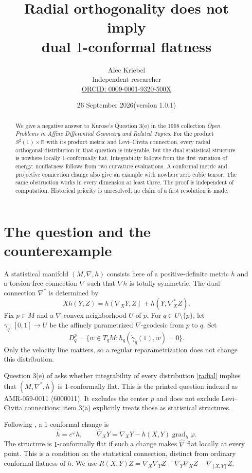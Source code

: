 \documentclass[11pt]{article}
\title{Radial orthogonality does not imply\\dual $1$-conformal flatness}
\author{Alec Kriebel\\\small Independent researcher\\
\small\href{https://orcid.org/0009-0001-9320-500X}{ORCID: 0009-0001-9320-500X}}
\date{26 September 2026\quad (version 1.0.1)}
\newcommand{\R}{\mathbb R}
\newcommand{\grad}{\operatorname{grad}}
\begin{document}
\maketitle
\begin{abstract}
We give a negative answer to Kurose's Question 3(e) in the 1998 collection
\emph{Open Problems in Affine Differential Geometry and Related Topics}.
For the product $S^2(1)\times\R$ with its product metric and Levi--Civita
connection, every radial orthogonal distribution in that question is
integrable, but the dual statistical structure is nowhere locally
$1$-conformally flat. Integrability follows from the first variation of
energy; nonflatness follows from two curvature evaluations. A conformal
metric and projective connection change also give an example with nowhere
zero cubic tensor. The same obstruction works in every dimension at least
three. The proof is independent of computation. Historical priority is
unresolved; no claim of a first resolution is made.
\end{abstract}

\section{The question and the counterexample}
A statistical manifold $(M,\nabla,h)$ consists here of a positive-definite
metric $h$ and a torsion-free connection $\nabla$ such that $\nabla h$ is
totally symmetric. The dual connection $\nabla^*$ is determined by
\[
Xh(Y,Z)=h(\nabla_XY,Z)+h(Y,\nabla_X^*Z).
\]
Fix $p\in M$ and a $\nabla$-convex neighborhood $U$ of $p$. For
$q\in U\setminus\{p\}$, let $\gamma_q:[0,1]\to U$ be the affinely
parametrized $\nabla$-geodesic from $p$ to $q$. Set
\begin{equation}\label{radial}
D^p_q=\{w\in T_qM:h_q(\dot\gamma_q(1),w)=0\}.
\end{equation}
Only the velocity line matters, so a regular reparametrization does not
change this distribution.

Question 3(e) of \cite[p.~126]{FMU} asks whether integrability of every
distribution \eqref{radial} implies that $(M,\nabla^*,h)$ is
$1$-conformally flat. This is the printed question indexed as
AMR-059-0011 (6000011). It excludes the center $p$ and does not exclude
Levi--Civita connections; item 3(a) explicitly treats those as statistical
structures.

Following \cite[p.~428]{Kurose}, a $1$-conformal change is
\begin{equation}\label{change}
\widehat h=e^\varphi h,\qquad
\widehat\nabla_XY=\nabla_XY-h(X,Y)\grad_h\varphi.
\end{equation}
The structure is $1$-conformally flat if such a change makes
$\widehat\nabla$ flat locally at every point. This is a condition on the
statistical connection, distinct from ordinary conformal flatness of $h$.
We use $R(X,Y)Z=\nabla_X\nabla_YZ-\nabla_Y\nabla_XZ-\nabla_{[X,Y]}Z$.
\end{document}
